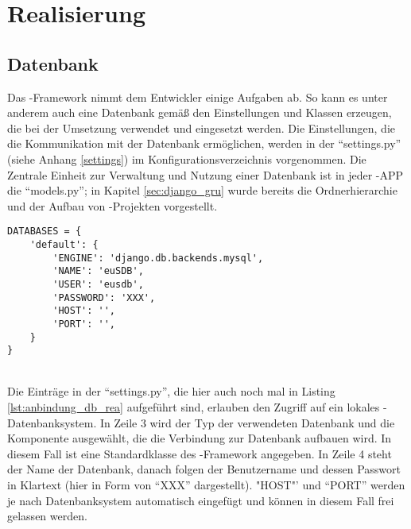 \chapter{Realisierung}
\label{chap:umsetzung}

\section{Datenbank}
\label{sec:Datenbank_rel}

Das -Framework nimmt dem Entwickler einige Aufgaben ab. So kann es
unter anderem auch eine Datenbank gemäß den Einstellungen und Klassen erzeugen, die
bei der Umsetzung verwendet und eingesetzt werden. Die Einstellungen, die die
Kommunikation mit der Datenbank ermöglichen, werden in der "`settings.py"'
(siehe Anhang \ref{settings}) im Konfigurationsverzeichnis vorgenommen. Die
Zentrale Einheit zur Verwaltung und Nutzung einer Datenbank ist in jeder -\ac{APP} die "`models.py"';
in Kapitel \ref{sec:django_gru} wurde bereits die Ordnerhierarchie und der Aufbau
von -Projekten vorgestellt.
\begin{lstlisting}[caption={Einstellungen eines Django-Projektes zur
Ansteuerung eines MySQL-Datenbanksystems
}, label=lst:anbindung_db_rea,captionpos=b] 
DATABASES = {
    'default': {
        'ENGINE': 'django.db.backends.mysql',
        'NAME': 'euSDB',
        'USER': 'eusdb',
        'PASSWORD': 'XXX',
        'HOST': '',
        'PORT': '',
    }
}
\end{lstlisting}
\\
Die Einträge in der "`settings.py"', die hier auch noch mal in Listing
\ref{lst:anbindung_db_rea} aufgeführt sind, erlauben den Zugriff auf ein lokales
-Datenbanksystem. In Zeile 3 wird der Typ der verwendeten Datenbank
und die Komponente ausgewählt, die die Verbindung zur Datenbank aufbauen wird.
In diesem Fall ist eine Standardklasse des -Framework angegeben.
In Zeile 4 steht der Name der Datenbank, danach folgen der Benutzername und
dessen Passwort in Klartext (hier in Form von "`XXX"' dargestellt). "HOST"' und
"`PORT"' werden je nach Datenbanksystem automatisch eingefügt und können in
diesem Fall frei gelassen werden.
